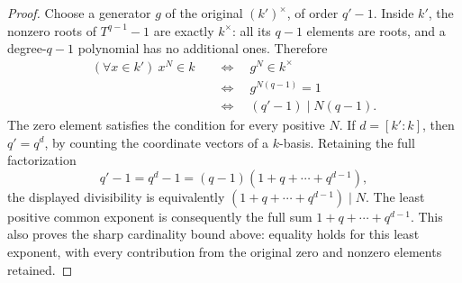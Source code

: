 \begin{proof}
Choose a generator $g$ of the original
$(k')^\times$, of order $q'-1$.
Inside $k'$, the nonzero roots of
$T^{q-1}-1$ are exactly $k^\times$:
all its $q-1$ elements are roots,
and a degree-$q-1$ polynomial has
no additional ones. Therefore
$$
\begin{split}
(\forall x\in k')\ x^N\in k
&\quad\Longleftrightarrow\quad g^N\in k^\times\\
&\quad\Longleftrightarrow\quad g^{N(q-1)}=1\\
&\quad\Longleftrightarrow\quad (q'-1)\mid N(q-1).
\end{split}
$$
The zero element satisfies the condition
for every positive $N$. If $d=[k':k]$,
then $q'=q^d$, by counting the coordinate
vectors of a $k$-basis. Retaining the
full factorization
$$
q'-1=q^d-1=(q-1)(1+q+\cdots+q^{d-1}),
$$
the displayed divisibility is equivalently
$(1+q+\cdots+q^{d-1})\mid N$. The least
positive common exponent is consequently
the full sum $1+q+\cdots+q^{d-1}$.
This also proves the sharp cardinality
bound above: equality holds for this
least exponent, with every contribution
from the original zero and nonzero
elements retained.
\end{proof}